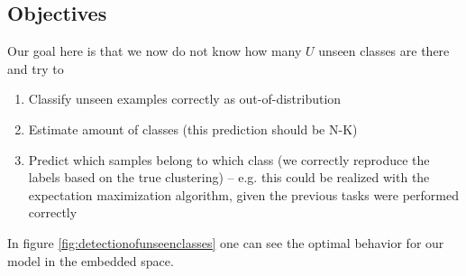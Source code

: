 \subsection{Objectives}
Our goal here is that we now do not know how many $U$ unseen classes are there and try to 
\begin{enumerate}
	\item Classify unseen examples correctly as out-of-distribution
	\item Estimate amount of classes (this prediction should be N-K)
	\item Predict which samples belong to which class (we correctly reproduce the labels based on the true clustering) -- e.g. this could be realized with the expectation maximization algorithm, given the previous tasks were performed correctly
\end{enumerate}

In figure \ref{fig:detectionofunseenclasses} one can see the optimal behavior for our model in the embedded space.


